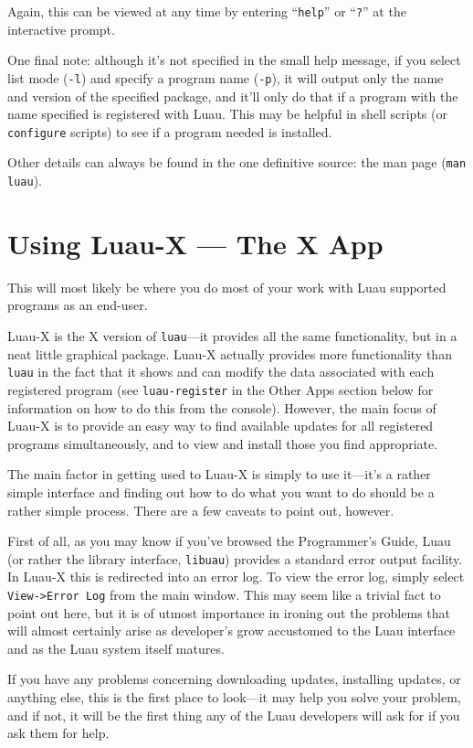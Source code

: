 \documentclass{report}
\begin{document}
Again, this can be viewed at any time by entering ``\verb+help+'' or ``\verb+?+'' at the interactive prompt.

One final note: although it's not specified in the small help message, if you select list mode (\verb+-l+) and specify a program name (\verb+-p+), it will output only the name and version of the specified package, and it'll only do that if a program with the name specified is registered with Luau.  This may be helpful in shell scripts (or \verb+configure+ scripts) to see if a program needed is installed.

Other details can always be found in the one definitive source: the man page (\verb+man luau+).

\section{Using Luau-X --- The X App}

This will most likely be where you do most of your work with Luau supported programs as an end-user.

Luau-X is the X version of \verb+luau+---it provides all the same functionality, but in a neat little graphical package.  Luau-X actually provides more functionality than \verb+luau+ in the fact that it shows and can modify the data associated with each registered program (see \verb+luau-register+ in the Other Apps section below for information on how to do this from the console).  However, the main focus of Luau-X is to provide an easy way to find available updates for all registered programs simultaneously, and to view and install those you find appropriate.

The main factor in getting used to Luau-X is simply to use it---it's a rather simple interface and finding out how to do what you want to do should be a rather simple process.  There are a few caveats to point out, however.

First of all, as you may know if you've browsed the Programmer's Guide, Luau (or rather the library interface, \verb+libuau+) provides a standard error output facility.  In Luau-X this is redirected into an error log.  To view the error log, simply select \verb+View->Error Log+ from the main window.  This may seem like a trivial fact to point out here, but it is of utmost importance in ironing out the problems that will almost certainly arise as developer's grow accustomed to the Luau interface and as the Luau system itself matures.

If you have any problems concerning downloading updates, installing updates, or anything else, this is the first place to look---it may help you solve your problem, and if not, it will be the first thing any of the Luau developers will ask for if you ask them for help.
\end{document}
